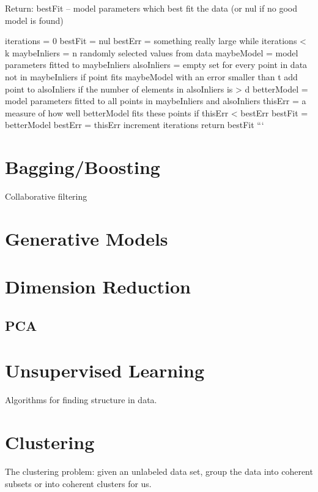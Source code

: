 Return:
    bestFit – model parameters which best fit the data (or nul if no good model is found)

iterations = 0
bestFit = nul
bestErr = something really large
while iterations < k {
    maybeInliers = n randomly selected values from data
    maybeModel = model parameters fitted to maybeInliers
    alsoInliers = empty set
    for every point in data not in maybeInliers {
        if point fits maybeModel with an error smaller than t
             add point to alsoInliers
    }
    if the number of elements in alsoInliers is > d {
        betterModel = model parameters fitted to all points in maybeInliers and alsoInliers
        thisErr = a measure of how well betterModel fits these points
        if thisErr < bestErr {
            bestFit = betterModel
            bestErr = thisErr
        }
    }
    increment iterations
}
return bestFit
```



\section{Bagging/Boosting}

Collaborative filtering

\section{Generative Models}

\section{Dimension Reduction}

\subsection{PCA}

\section{Unsupervised Learning}

Algorithms for finding structure in data.

\section{Clustering}

The clustering problem: given an unlabeled data set, group the data into coherent  subsets or into coherent clusters for us.

